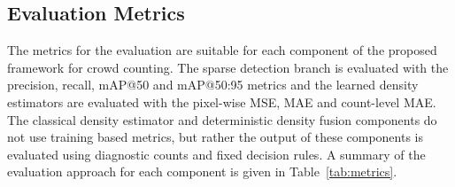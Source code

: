\subsection{Evaluation Metrics}
\label{subsec:evaluation-metrics}

The metrics for the evaluation are suitable for each component of the proposed framework for crowd counting. The sparse detection branch is evaluated with the precision, recall, mAP@50 and mAP@50:95 metrics and the learned density estimators are evaluated with the pixel-wise MSE, MAE and count-level MAE. The classical density estimator and deterministic density fusion components do not use training based metrics, but rather the output of these components is evaluated using diagnostic counts and fixed decision rules. A summary of the evaluation approach for each component is given in Table~\ref{tab:metrics}.

